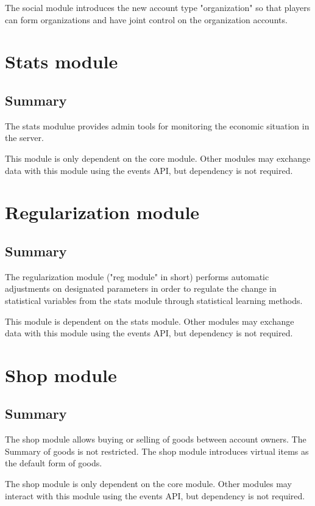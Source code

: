 \documentclass{report}
\begin{document}
			The social module introduces the new account type "organization" so that players can form organizations
			and have joint control on the organization accounts.

	\chapter{Stats module}
		\section{Summary}

			The stats modulue provides admin tools for monitoring the economic situation in the server.

			This module is only dependent on the core module.
			Other modules may exchange data with this module using the events API,
			but dependency is not required.

	\chapter{Regularization module}
		\section{Summary}

			The regularization module ("reg module" in short) performs automatic adjustments on designated parameters
			in order to regulate the change in statistical variables from the stats module through statistical learning methods.

			This module is dependent on the stats module.
			Other modules may exchange data with this module using the events API,
			but dependency is not required.

	\chapter{Shop module}
		\section{Summary}

			The shop module allows buying or selling of goods between account owners.
			The Summary of goods is not restricted.
			The shop module introduces virtual items as the default form of goods.

			The shop module is only dependent on the core module.
			Other modules may interact with this module using the events API,
			but dependency is not required.
\end{document}
